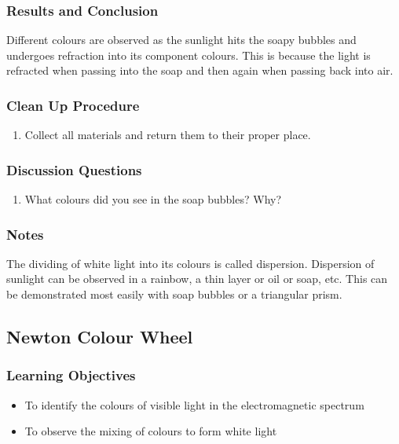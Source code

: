 \subsubsection*{Results and Conclusion}
Different colours are observed as the sunlight hits the soapy bubbles and undergoes refraction into its component colours.  This is because the light is refracted when passing into the soap and then again when passing back into air.

\subsubsection*{Clean Up Procedure}
\begin{enumerate}
\item{Collect all materials and return them to their proper place.} 
\end{enumerate}

\subsubsection*{Discussion Questions}
\begin{enumerate}
\item{What colours did you see in the soap bubbles? Why?}
\end{enumerate}

\subsubsection*{Notes}
The dividing of white light into its colours is called dispersion.  Dispersion of sunlight can be observed in a rainbow, a thin layer or oil or soap, etc.  This can be demonstrated most easily with soap bubbles or a triangular prism.

\subsection{Newton Colour Wheel}

\subsubsection*{Learning Objectives}
\begin{itemize}
\item{To identify the colours of visible light in the electromagnetic spectrum} 
\item{To observe the mixing of colours to form white light} 
\end{itemize}

